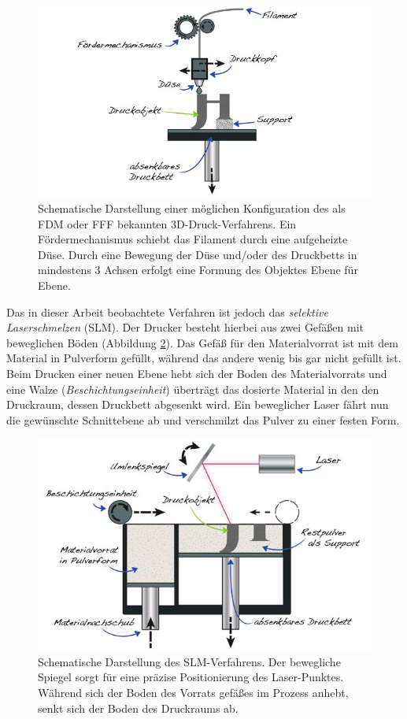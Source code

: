 		\begin{figure}
			\centering
			\includegraphics[width=\textwidth]{chapter/main/img/FDM.png}
			\caption{Schematische Darstellung einer möglichen Konfiguration des als FDM oder FFF
			bekannten 3D-Druck-Verfahrens. Ein Fördermechanismus schiebt das Filament durch eine
			aufgeheizte Düse. Durch eine Bewegung der Düse und/oder des Druckbetts in mindestens 3
			Achsen erfolgt eine Formung des Objektes Ebene für Ebene. \cite[S. 114]{horsch20143d}}
			\label{fig:fdm}
		\end{figure}

		Das in dieser Arbeit beobachtete Verfahren ist jedoch das \emph{selektive Laserschmelzen}
		(SLM). Der Drucker besteht hierbei aus zwei Gefäßen mit beweglichen Böden (Abbildung
		\ref{fig:slm_sls}). Das Gefäß für den Materialvorrat ist mit dem Material in Pulverform
		gefüllt, während das andere wenig bis gar nicht gefüllt ist. Beim Drucken einer neuen Ebene
		hebt sich der Boden des Materialvorrats und eine Walze (\emph{Beschichtungseinheit}) überträgt
		das dosierte Material in den den Druckraum, dessen Druckbett abgesenkt wird. Ein beweglicher
		Laser fährt nun die gewünschte Schnittebene ab und verschmilzt das Pulver zu einer festen Form.

		\begin{figure}
			\centering
			\includegraphics[width=\textwidth]{chapter/main/img/SLS_SLM.png}
			\caption{Schematische Darstellung des SLM-Verfahrens. Der bewegliche Spiegel sorgt
			für eine präzise Positionierung des Laser-Punktes. Während sich der Boden des Vorrats\-
			gefäßes im Prozess anhebt, senkt sich der Boden des Druckraums ab.
			\cite[S. 119]{horsch20143d}}
			\label{fig:slm_sls}
		\end{figure}

